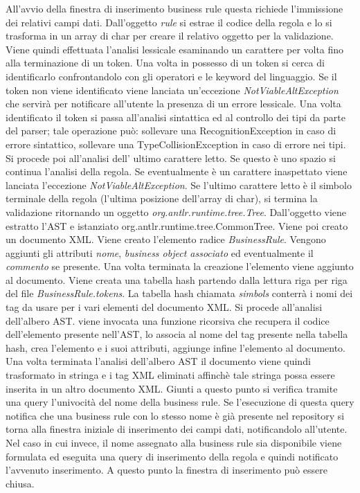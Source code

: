 All'avvio della finestra di inserimento business rule questa richiede l'immissione dei relativi campi dati. Dall'oggetto \textit{rule} si estrae il codice della regola e lo si trasforma in un array di char per creare il relativo oggetto per la validazione. Viene quindi effettuata l'analisi lessicale esaminando un carattere per volta fino alla terminazione di un token. Una volta in possesso di un token si cerca di identificarlo confrontandolo con gli operatori e le keyword del linguaggio. Se il token non viene identificato viene lanciata un'eccezione \textit{NotViableAltException} che servir\`a per notificare all'utente la presenza di un errore lessicale. Una volta identificato il token si passa all'analisi sintattica ed al controllo dei tipi da parte del parser; tale operazione pu\`o: sollevare una RecognitionException in caso di errore sintattico, sollevare una TypeCollisionException in caso di errore nei tipi. Si procede poi all'analisi dell' ultimo carattere letto. Se questo \`e uno spazio si continua l'analisi della regola. Se eventualmente \`e un carattere inaspettato viene lanciata l'eccezione \textit{NotViableAltException}. Se l'ultimo carattere letto \`e il simbolo terminale della regola (l'ultima posizione dell'array di char), si termina la validazione ritornando un oggetto \textit{org.antlr.runtime.tree.Tree}.
Dall'oggetto viene estratto l'AST e istanziato org.antlr.runtime.tree.CommonTree. Viene poi creato un documento XML. Viene creato l'elemento radice \textit{BusinessRule}. Vengono aggiunti gli attributi \textit{nome}, \textit{business object associato} ed eventualmente il \textit{commento} se presente. Una volta terminata la creazione l'elemento viene aggiunto al documento. Viene creata una tabella hash partendo dalla lettura riga per riga del file \textit{BusinessRule.tokens}. La tabella hash chiamata \textit{simbols} conterr\`a i nomi dei tag da usare per i vari elementi del documento XML. Si procede all'analisi dell'albero AST. viene invocata una funzione ricorsiva che recupera il codice dell'elemento presente nell'AST, lo associa al nome del tag presente nella tabella hash, crea l'elemento e i suoi attributi, aggiunge infine l'elemento al documento. Una volta terminata l'analisi dell'albero AST il documento viene quindi trasformato in stringa e i tag XML eliminati affinch\`e tale stringa possa essere inserita in un altro documento XML. Giunti a questo punto si verifica tramite una query l'univocit\`a del nome della business rule. Se l'esecuzione di questa query notifica che una business rule con lo stesso nome \`e gi\`a presente nel repository si torna alla finestra iniziale di inserimento dei campi dati, notificandolo all'utente. Nel caso in cui invece, il nome assegnato alla business rule sia disponibile viene formulata ed eseguita una query di inserimento della regola e quindi notificato l'avvenuto inserimento. A questo punto la finestra di inserimento pu\`o essere chiusa.



